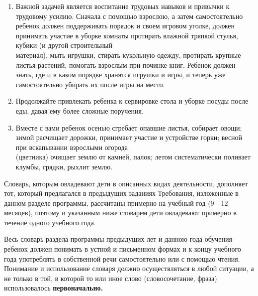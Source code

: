 \documentclass{book}
\begin{document}
\begin{enumerate}
\def\labelenumi{\arabic{enumi}.}
\setcounter{enumi}{5}
\item
  
  Важной задачей является воспитание трудовых навыков и привычки к
  трудовому усилию. Сначала с помощью взрослою, а затем самостоятельно
  ребенок должен поддерживать порядок и своем игровом уголке, должен
  принимать участие в уборке комнаты протирать влажной тряпкой стулья,
  кубики (и другой строительный\\
  материал), мыть игрушки, стирать кукольную одежду, протирать крупные
  листья растений, помогать взрослым при починке книг. Ребенок должен
  знать, где и в каком порядке хранятся игрушки и игры, и теперь уже
  самостоятельно убирать их после игры на место.
  
\item
  
  Продолжайте привлекать ребенка к сервировке стола и уборке посуды
  после еды, давая ему более сложные поручения.
  
\item
  
  Вместе с вами ребенок осенью сгребает опавшие листья, собирает овощи;
  зимой расчищает дорожки, принимает участие и устройстве горки; весной
  при вскапывании взрослыми огорода\\
  (цветника) очищает землю от камней, палок; летом систематически
  поливает клумбы, грядки, рыхлит землю.
  
\end{enumerate}


Словарь, которым овладевают дети в описанных видах деятельности,
дополняет тот, который предлагался в предыдущих заданиях Требования,
изложенные в данном разделе программы, рассчитаны примерно на учебный
год (9---12 месяцев), поэтому и указанным ниже словарем дети овладевают
примерно в течение одного учебного года.

Весь словарь раздела программы предыдущих лет и данною года обучения
ребенок должен понимать в устной и письменном формах и к концу учебного
года употреблять в собственной речи самостоятельно или с помощью чтения.
Понимание и использование словаря должно осуществляться в любой
ситуации, а не только в той, в которой то или иное слово
(словосочетание, фраза) использовалось \textbf{первоначально.}
\end{document}
